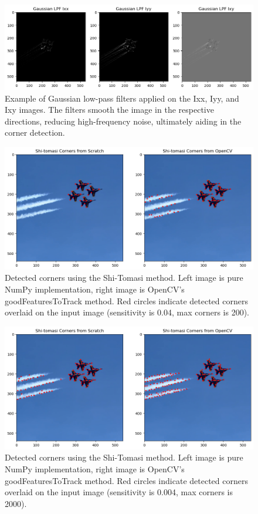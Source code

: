 \documentclass[11pt, conference, letterpaper]{IEEEtran}
\begin{document}
\begin{figure}[t]
    \centering
    \includegraphics[width=0.95\linewidth]{images/gaussian_low_pass_filters.png}
    \caption{Example of Gaussian low-pass filters applied on the Ixx, Iyy, and Ixy images. The filters smooth the image in the respective directions, reducing high-frequency noise, ultimately aiding in the corner detection.}
    \label{fig:gaussian_lpf}
\end{figure}

\begin{figure}[h]
    \centering
    \includegraphics[width=0.95\linewidth]{images/shi_tomasi_corners.png}
    \caption{Detected corners using the Shi-Tomasi method. Left image is pure NumPy implementation, right image is OpenCV's goodFeaturesToTrack method. Red circles indicate detected corners overlaid on the input image (sensitivity is 0.04, max corners is 200).}
    \label{fig:shi_tomasi_results}
\end{figure}

\begin{figure}[h]
    \centering
    \includegraphics[width=0.95\linewidth]{images/shi_tomasi_corners_2.png}
    \caption{Detected corners using the Shi-Tomasi method. Left image is pure NumPy implementation, right image is OpenCV's goodFeaturesToTrack method. Red circles indicate detected corners overlaid on the input image (sensitivity is 0.004, max corners is 2000).}
    \label{fig:shi_tomasi_results2}
\end{figure}
\twocolumn
\end{document}
